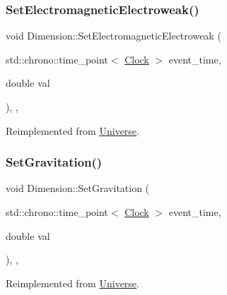 \mbox{\label{classDimension_aead73fc6a25388d14b514b2170735b1b}} 
\subsubsection{\texorpdfstring{Set\+Electromagnetic\+Electroweak()}{SetElectromagneticElectroweak()}}
{\footnotesize\ttfamily void Dimension\+::\+Set\+Electromagnetic\+Electroweak (\begin{DoxyParamCaption}\item[{std\+::chrono\+::time\+\_\+point$<$ \mbox{\hyperlink{universe_8h_a0ef8d951d1ca5ab3cfaf7ab4c7a6fd80}{Clock}} $>$}]{event\+\_\+time,  }\item[{double}]{val }\end{DoxyParamCaption})\hspace{0.3cm}{\ttfamily [inline]}, {\ttfamily [final]}, {\ttfamily [virtual]}}



Reimplemented from \mbox{\hyperlink{classUniverse_a608aa95698380f791a0ffba45cc1bee3}{Universe}}.

\mbox{\label{classDimension_aeec6887382d09e3d78382582ff4e7c33}} 
\subsubsection{\texorpdfstring{Set\+Gravitation()}{SetGravitation()}}
{\footnotesize\ttfamily void Dimension\+::\+Set\+Gravitation (\begin{DoxyParamCaption}\item[{std\+::chrono\+::time\+\_\+point$<$ \mbox{\hyperlink{universe_8h_a0ef8d951d1ca5ab3cfaf7ab4c7a6fd80}{Clock}} $>$}]{event\+\_\+time,  }\item[{double}]{val }\end{DoxyParamCaption})\hspace{0.3cm}{\ttfamily [inline]}, {\ttfamily [final]}, {\ttfamily [virtual]}}



Reimplemented from \mbox{\hyperlink{classUniverse_ae0cb8d86b2fbb8396d605160344b42f5}{Universe}}.

